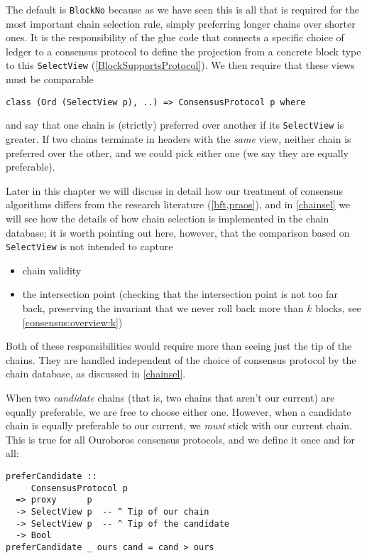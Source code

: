 The default is \lstinline!BlockNo! because as we have seen this is all that is
required for the most important chain selection rule, simply preferring longer
chains over shorter ones. It is the responsibility of the glue code that
connects a specific choice of ledger to a consensus protocol to define the
projection from a concrete block type to this \lstinline!SelectView!
(\ref{BlockSupportsProtocol}). We then require that these views must be
comparable
%
\begin{lstlisting}
class (Ord (SelectView p), ..) => ConsensusProtocol p where
\end{lstlisting}
%
and say that one chain is (strictly) preferred over another if its
\lstinline!SelectView! is greater. If two chains terminate in headers with
the \emph{same} view, neither chain is preferred over the other, and we
could pick either one (we say they are equally preferable).

Later in this chapter we will discuss in detail how our treatment of
consensus algorithms differs from the research literature (\cref{bft,praos}),
and in \cref{chainsel} we will see how the details of how chain selection
is implemented in the chain database; it is worth pointing out here, however, that the comparison based on \lstinline!SelectView! is not intended to capture

\begin{itemize}
\item chain validity
\item the intersection point (checking that the intersection point is not too
far back, preserving the invariant that we never roll back more than $k$ blocks,
see \cref{consensus:overview:k})
\end{itemize}

Both of these responsibilities would require more than seeing just
the tip of the chains. They are handled independent of the choice of
consensus protocol by the chain database, as discussed in \cref{chainsel}.

When two \emph{candidate} chains (that is, two chains that aren't our current)
are equally preferable, we are free to choose either one. However, when a
candidate chain is equally preferable to our current, we \emph{must} stick
with our current chain. This is true for all Ouroboros consensus protocols,
and we define it once and for all:

\begin{lstlisting}
preferCandidate ::
     ConsensusProtocol p
  => proxy      p
  -> SelectView p  -- ^ Tip of our chain
  -> SelectView p  -- ^ Tip of the candidate
  -> Bool
preferCandidate _ ours cand = cand > ours
\end{lstlisting}

